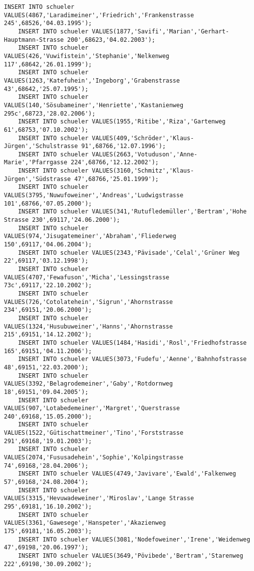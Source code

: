 \begin{lstlisting}[breaklines=True, numbers=none, basicstyle=\tiny, keepspaces=false]
	INSERT INTO schueler VALUES(4867,'Laradimeiner','Friedrich','Frankenstrasse 245',68526,'04.03.1995');
	INSERT INTO schueler VALUES(1877,'Savifi','Marian','Gerhart-Hauptmann-Strasse 200',68623,'04.02.2003');
	INSERT INTO schueler VALUES(426,'Vuwifistein','Stephanie','Nelkenweg 117',68642,'26.01.1999');
	INSERT INTO schueler VALUES(1263,'Katefuhein','Ingeborg','Grabenstrasse 43',68642,'25.07.1995');
	INSERT INTO schueler VALUES(140,'Sösubameiner','Henriette','Kastanienweg 295c',68723,'28.02.2006');
	INSERT INTO schueler VALUES(1955,'Ritibe','Riza','Gartenweg 61',68753,'07.10.2002');
	INSERT INTO schueler VALUES(409,'Schröder','Klaus-Jürgen','Schulstrasse 91',68766,'12.07.1996');
	INSERT INTO schueler VALUES(2663,'Votuduson','Anne-Marie','Pfarrgasse 224',68766,'12.12.2002');
	INSERT INTO schueler VALUES(3160,'Schmitz','Klaus-Jürgen','Südstrasse 47',68766,'25.01.1999');
	INSERT INTO schueler VALUES(3795,'Nuwufoweiner','Andreas','Ludwigstrasse 101',68766,'07.05.2000');
	INSERT INTO schueler VALUES(341,'Rutufledemüller','Bertram','Hohe Strasse 230',69117,'24.06.2000');
	INSERT INTO schueler VALUES(974,'Jisugatemeiner','Abraham','Fliederweg 150',69117,'04.06.2004');
	INSERT INTO schueler VALUES(2343,'Pävisade','Celal','Grüner Weg 22',69117,'03.12.1998');
	INSERT INTO schueler VALUES(4707,'Fewafuson','Micha','Lessingstrasse 73c',69117,'22.10.2002');
	INSERT INTO schueler VALUES(726,'Cotolatehein','Sigrun','Ahornstrasse 234',69151,'20.06.2000');
	INSERT INTO schueler VALUES(1324,'Husubuweiner','Hanns','Ahornstrasse 215',69151,'14.12.2002');
	INSERT INTO schueler VALUES(1484,'Hasidi','Rosl','Friedhofstrasse 165',69151,'04.11.2006');
	INSERT INTO schueler VALUES(3073,'Fudefu','Aenne','Bahnhofstrasse 48',69151,'22.03.2000');
	INSERT INTO schueler VALUES(3392,'Belagrodemeiner','Gaby','Rotdornweg 18',69151,'09.04.2005');
	INSERT INTO schueler VALUES(907,'Lotabedemeiner','Margret','Querstrasse 240',69168,'15.05.2000');
	INSERT INTO schueler VALUES(1522,'Gütischattmeiner','Tino','Forststrasse 291',69168,'19.01.2003');
	INSERT INTO schueler VALUES(2074,'Fususadehein','Sophie','Kolpingstrasse 74',69168,'28.04.2006');
	INSERT INTO schueler VALUES(4749,'Javivare','Ewald','Falkenweg 57',69168,'24.08.2004');
	INSERT INTO schueler VALUES(3315,'Hevuwadeweiner','Miroslav','Lange Strasse 295',69181,'16.10.2002');
	INSERT INTO schueler VALUES(3361,'Gawesege','Hanspeter','Akazienweg 175',69181,'16.05.2003');
	INSERT INTO schueler VALUES(3081,'Nodefoweiner','Irene','Weidenweg 47',69198,'20.06.1997');
	INSERT INTO schueler VALUES(3649,'Pövibede','Bertram','Starenweg 222',69198,'30.09.2002');

\end{lstlisting}
